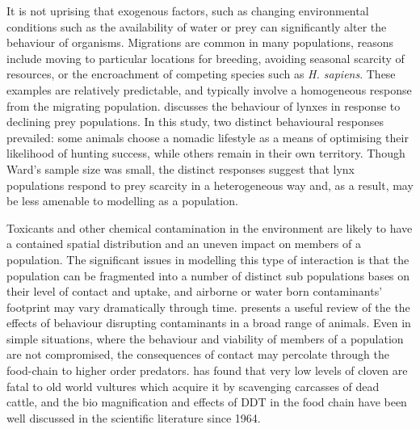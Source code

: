 It is not uprising that exogenous factors, such as changing
environ\-mental conditions such as the availability of water or prey
can significantly alter the behaviour of organisms.  Migrations are
common in many populations, reasons include moving to particular
locations for breeding, avoiding seasonal scarcity of resources, or
the encroachment of competing species such as \emph{H. sapiens}.
These examples are relatively predictable, and typically involve a
homogeneous response from the migrating population.
\Cite{ward1985behavioural} discusses the behaviour of
lynxes in response to declining prey populations. In this study, two
distinct behavioural responses prevailed: some animals choose a
nomadic lifestyle as a means of optimising their likelihood of hunting
success, while others remain in their own territory.  Though Ward's
sample size was small, the distinct responses suggest that lynx
populations respond to prey scarcity in a heterogeneous way and, as a
result, may be less amenable to modelling as a population.

Toxicants and other chemical contamination in the environment are
likely to have a contained spatial distribution and an uneven impact
on members of a population. The significant issues in modelling this
type of interaction is that the population can be fragmented into a
number of distinct sub populations bases on their level of contact and
uptake, and airborne or water born contaminants' footprint may vary
dramatically through time. \Cite{zala2004abnormal} presents a useful
review of the the effects of behaviour disrupting contaminants in a
broad range of animals.  Even in simple situations, where the behaviour
and viability of members of a population are not compromised, the
consequences of contact may percolate through the food-chain to higher
order predators. \Cite{swan2006toxicity} has found that very low
levels of cloven are fatal to old world vultures which acquire it
by scavenging carcasses of dead cattle, and the bio magnification and
effects of DDT in the food chain have been well discussed in the
scientific literature since 1964.

